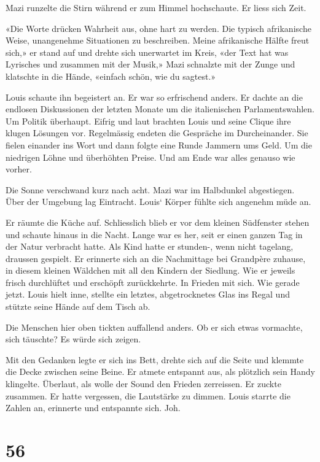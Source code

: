 Mazi runzelte die Stirn während er zum Himmel hochschaute. Er liess sich
Zeit.

«Die Worte drücken Wahrheit aus, ohne hart zu werden. Die typisch
afrikanische Weise, unangenehme Situationen zu beschreiben. Meine
afrikanische Hälfte freut sich,» er stand auf und drehte sich unerwartet
im Kreis, «der Text hat was Lyrisches und zusammen mit der Musik,» Mazi
schnalzte mit der Zunge und klatschte in die Hände, «einfach schön, wie
du sagtest.»

Louis schaute ihn begeistert an. Er war so erfrischend anders. Er dachte
an die endlosen Diskussionen der letzten Monate um die italienischen
Parlamentswahlen. Um Politik überhaupt. Eifrig und laut brachten Louis
und seine Clique ihre klugen Lösungen vor. Regelmässig endeten die
Gespräche im Durcheinander. Sie fielen einander ins Wort und dann folgte
eine Runde Jammern ums Geld. Um die niedrigen Löhne und überhöhten
Preise. Und am Ende war alles genauso wie vorher.

Die Sonne verschwand kurz nach acht. Mazi war im Halbdunkel abgestiegen.
Über der Umgebung lag Eintracht. Louis` Körper fühlte sich angenehm müde
an.

Er räumte die Küche auf. Schliesslich blieb er vor dem kleinen
Südfenster stehen und schaute hinaus in die Nacht. Lange war es her,
seit er einen ganzen Tag in der Natur verbracht hatte. Als Kind hatte er
stunden-, wenn nicht tagelang, draussen gespielt. Er erinnerte sich an
die Nachmittage bei Grandpère zuhause, in diesem kleinen Wäldchen mit
all den Kindern der Siedlung. Wie er jeweils frisch durchlüftet und
erschöpft zurückkehrte. In Frieden mit sich. Wie gerade jetzt. Louis
hielt inne, stellte ein letztes, abgetrocknetes Glas ins Regal und
stützte seine Hände auf dem Tisch ab.

Die Menschen hier oben tickten auffallend anders. Ob er sich etwas
vormachte, sich täuschte? Es würde sich zeigen.

Mit den Gedanken legte er sich ins Bett, drehte sich auf die Seite und
klemmte die Decke zwischen seine Beine. Er atmete entspannt aus, als
plötzlich sein Handy klingelte. Überlaut, als wolle der Sound den
Frieden zerreissen. Er zuckte zusammen. Er hatte vergessen, die
Lautstärke zu dimmen. Louis starrte die Zahlen an, erinnerte und
entspannte sich. Joh.

\chapter{56}\label{section-56}

